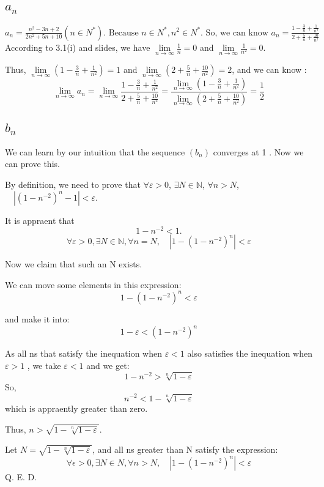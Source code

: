 \documentclass[11pt,twoside,a4paper]{article}
\begin{document}
\subsection{$a_{n}$}
$\displaystyle a_{n}=\frac{n^{2}-3 n+2}{2 n^{2}+5 n+10}\left(n \in N^{*}\right) 
\text {.  Because } n \in N^{*}, n^{2} \in N^{*} 
\text {.  So, we can know }  a_{n}=\frac{1-\frac{3}{n}+\frac{1}{n^{2}}}{2+\frac{5}{n}+\frac{10}{n^{2}}}$
According to 3.1(i) and slides, we have $\displaystyle\lim\limits_{n\to\infty}\frac{1}{n}=0$ and $\displaystyle\lim\limits_{n\to\infty}\frac{1}{n^2}=0$.\par
Thus, $\displaystyle \lim\limits_{n\to\infty} (1-\frac{3}{n}+\frac{1}{n^{2}})=1$ and $\displaystyle \lim\limits_{n\to\infty} (2+\frac{5}{n}+\frac{10}{n^{2}})=2$, and we can know :
$$\displaystyle \lim\limits_{n\to\infty} a_{n}= \lim\limits_{n\to\infty}\frac{1-\frac{3}{n}+\frac{1}{n^{2}}}{2+\frac{5}{n}+\frac{10}{n^{2}}}=\frac{\lim\limits_{n\to\infty}(1-\frac{3}{n}+\frac{1}{n^{2}})}{\lim\limits_{n\to\infty}(2+\frac{5}{n}+\frac{10}{n^{2}})}=\frac{1}{2}$$
\subsection{$b_{n}$}
We can learn by our intuition that the sequence  $\left(b_{n}\right)$  converges at 1 . Now we can prove this.
\par\noindent
By definition, we need to prove that
 $\forall \varepsilon>0$, $\exists N \in \mathbb{N}$, $\forall n>N$, $\quad\left|\left(1-n^{-2}\right)^{n}-1\right|<\varepsilon $.
\par\noindent
It is appraent that  $$1-n^{-2}<1. $$  
 $$\forall \varepsilon>0, \exists N \in \mathbb{N}, \forall n=N, \quad\left| 1-\left(1-n^{-2}\right)^{n}\right|<\varepsilon$$
\par\noindent
Now we claim that such an  N  exists.
\par\noindent
We can move some elements in this expression:
$$1-\left(1-n^{-2}\right)^{n}<\varepsilon$$
\par\noindent
and make it into:
$$1-\varepsilon<\left(1-n^{-2}\right)^{n} $$
\par\noindent
As all ns that satisfy the inequation when  $\varepsilon<1$  also satisfies the inequation when  $\varepsilon>1$ , we take  $\varepsilon<1$  and we get:
$$1-n^{-2}>\sqrt[n]{1-\varepsilon} $$
So,
$$n^{-2}<1-\sqrt[n]{1-\varepsilon}$$
which is appraently greater than zero.
\par\noindent
Thus,  $n>\sqrt{1-\sqrt[n]{1-\varepsilon}}$.
\par\noindent
Let  $N=\sqrt{1-\sqrt[n]{1-\varepsilon}}$,  and all ns greater than  N  satisfy the expression:
 $$\forall \epsilon>0, \exists N \in N, \forall n>N, \quad\left|1-\left(1-n^{-2}\right)^{n}\right|<\varepsilon$$
Q. E. D.
\end{document}
